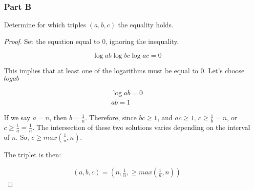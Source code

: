 \subsubsection*{Part B}

Determine for which triples $(a, b, c)$ the equality holds.

\begin{proof}
    Set the equation equal to 0, ignoring the inequality.

    \begin{equation*}
    \log{ab}\log{bc}\log{ac} = 0
    \end{equation*}

    This implies that at least one of the logarithms must be equal to 0. Let's choose $log{ab}$
    
    \begin{gather*}
        \log{ab} = 0 \\ 
        ab = 1
    \end{gather*}

    If we say $a = n$, then $b = \frac{1}{n}$. Therefore, since $bc \geq 1$, and $ac \geq 1$, $c \geq \frac{1}{b} =  n$, or $c \geq \frac{1}{a} =  \frac{1}{n}$. The intersection of these two solutions varies depending on the interval of $n$. So, $c \geq max(\frac{1}{n}, n)$.

    The triplet is then:

    \begin{gather*}
        (a, b, c) = \left(n, \frac{1}{n}, \geq max\left(\frac{1}{n}, n\right)\right)
    \end{gather*}
\end{proof}

